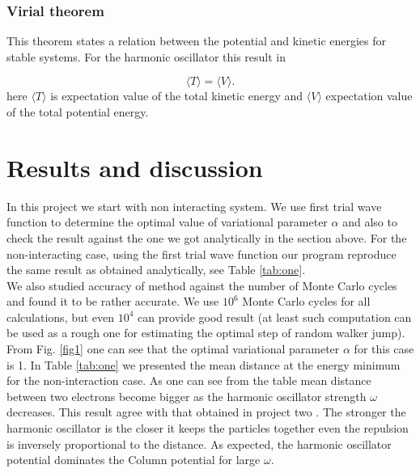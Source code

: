 \documentclass[10pt]{article}
\begin{document}
\subsubsection{Virial theorem}
This theorem states a relation between the potential and kinetic energies for stable systems. For the harmonic oscillator this result in 

\begin{equation*}
  \langle T \rangle= \langle V \rangle.
  \end{equation*}
here $\langle T \rangle$ is expectation value of the total kinetic energy and   $\langle V \rangle$ expectation value of the total potential energy.

\newpage
\section{Results and discussion}\label{results}

In this project we start with non interacting system. We use first trial wave function to determine the optimal value of variational parameter $\alpha$ and also to check the result against the one we got analytically in the section above. For the non-interacting case, using the first trial wave function our program reproduce the same result as obtained analytically, see Table \ref{tab:one}. \\
We also studied accuracy of method against the number of Monte Carlo cycles and found it to be rather accurate. We use $10^6$ Monte Carlo cycles for all calculations, but even $10^4$ can provide good result (at least such computation can be used as a rough one for estimating the optimal step of random walker jump). 
From Fig. \ref{fig1} one can see that the optimal variational parameter $\alpha$ for this case is 1. In Table \ref{tab:one} we presented the mean distance at the energy minimum for the non-interaction case. As one can see from the table mean distance between two electrons become bigger as the harmonic oscillator strength $\omega$ decreases. This result agree with that obtained in project two \cite{proj2}. The stronger the harmonic oscillator is the closer it keeps the particles together even the repulsion is inversely proportional to the distance. As expected, the harmonic oscillator potential dominates the Column potential for large $\omega$. 
\end{document}
